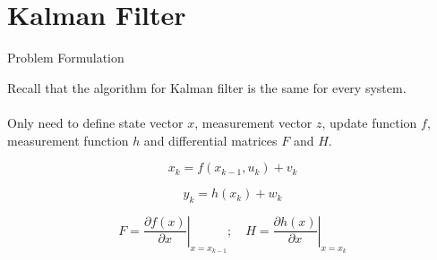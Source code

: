 \section{Kalman Filter}
\begin{frame}{Problem Formulation}

Recall that the algorithm for Kalman filter is the same for every system. \\~\\

Only need to define state vector $x$, measurement vector $z$, update function $f$, measurement function $h$ and differential matrices $F$ and $H$.


\begin{equation}
    \label{eq:non_linear_update}
    x_{k} = f( x_{k-1}, u_k) + v_k
\end{equation}

\begin{equation}
    \label{eq:non_linear_meas}
    y_k = h (x_k) + w_k
\end{equation}

\begin{equation}
    F = \left. \frac{\partial f(x)}{\partial x} \right\vert_{x = x_{k-1}}; \quad
    H = \left. \frac{\partial h(x)}{\partial x} \right\vert_{x = x_{k}}
\end{equation}

\end{frame}

